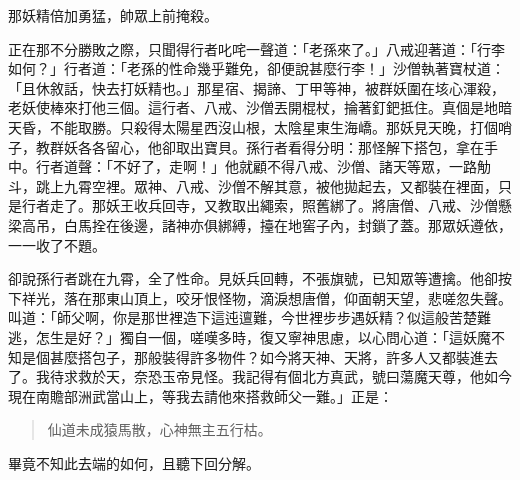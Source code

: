 那妖精倍加勇猛，帥眾上前掩殺。

正在那不分勝敗之際，只聞得行者叱咤一聲道：「老孫來了。」八戒迎著道：「行李如何？」行者道：「老孫的性命幾乎難免，卻便說甚麼行李！」沙僧執著寶杖道：「且休敘話，快去打妖精也。」那星宿、揭諦、丁甲等神，被群妖圍在垓心渾殺，老妖使棒來打他三個。這行者、八戒、沙僧丟開棍杖，掄著釘鈀抵住。真個是地暗天昏，不能取勝。只殺得太陽星西沒山根，太陰星東生海嶠。那妖見天晚，打個哨子，教群妖各各留心，他卻取出寶貝。孫行者看得分明：那怪解下搭包，拿在手中。行者道聲：「不好了，走啊！」他就顧不得八戒、沙僧、諸天等眾，一路觔斗，跳上九霄空裡。眾神、八戒、沙僧不解其意，被他拋起去，又都裝在裡面，只是行者走了。那妖王收兵回寺，又教取出繩索，照舊綁了。將唐僧、八戒、沙僧懸梁高吊，白馬拴在後邊，諸神亦俱綁縛，擡在地窖子內，封鎖了蓋。那眾妖遵依，一一收了不題。

卻說孫行者跳在九霄，全了性命。見妖兵回轉，不張旗號，已知眾等遭擒。他卻按下祥光，落在那東山頂上，咬牙恨怪物，滴淚想唐僧，仰面朝天望，悲嗟忽失聲。叫道：「師父啊，你是那世裡造下這迍邅難，今世裡步步遇妖精？似這般苦楚難逃，怎生是好？」獨自一個，嗟嘆多時，復又寧神思慮，以心問心道：「這妖魔不知是個甚麼搭包子，那般裝得許多物件？如今將天神、天將，許多人又都裝進去了。我待求救於天，奈恐玉帝見怪。我記得有個北方真武，號曰蕩魔天尊，他如今現在南贍部洲武當山上，等我去請他來搭救師父一難。」正是：
\begin{quote}
仙道未成猿馬散，心神無主五行枯。
\end{quote}

畢竟不知此去端的如何，且聽下回分解。
